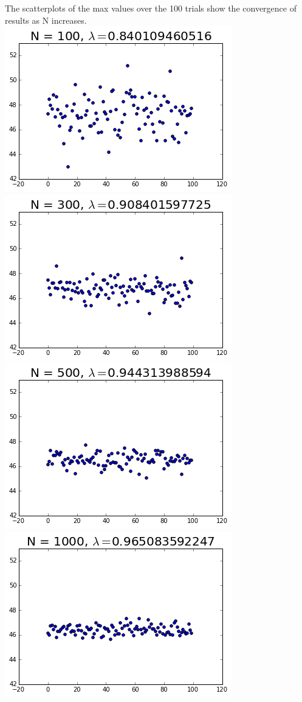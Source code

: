 \documentclass{article}
\begin{document}
		The scatterplots of the max values over the 100 trials show the convergence of results as N increases.\\
		\hspace*{-3.75cm}
		\includegraphics[scale=0.75]{100_scatter}
		\includegraphics[scale=0.75]{300_scatter}
		\hspace*{-3.75cm}
		\includegraphics[scale=0.75]{500_scatter}
		\includegraphics[scale=0.75]{1000_scatter}	
\end{document}
